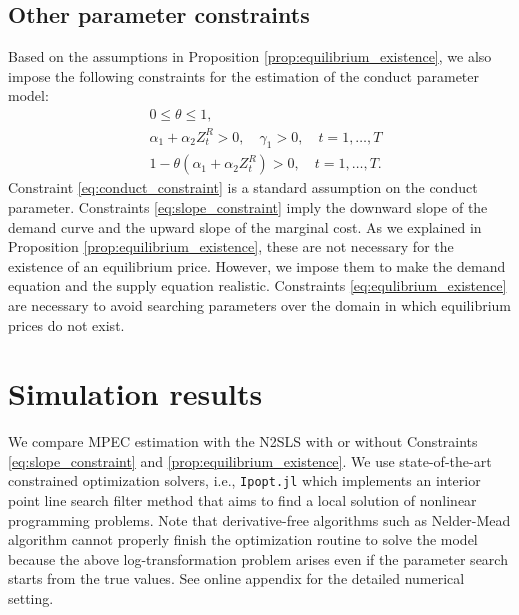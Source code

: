 \documentclass[11pt, a4paper]{article}
\begin{document}
\subsection{Other parameter constraints}
Based on the assumptions in Proposition \ref{prop:equilibrium_existence}, we also impose the following constraints for the estimation of the conduct parameter model:
\begin{align}
    &0\le\theta \le 1,\label{eq:conduct_constraint}\\
    &\alpha_1 + \alpha_2 Z_{t}^{R} >0, \quad \gamma_1>0 ,\quad t = 1,\ldots, T\label{eq:slope_constraint}\\
    &1- \theta(\alpha_1 + \alpha_2 Z_{t}^{R}) >0,\quad t = 1,\ldots, T.\label{eq:equlibrium_existence}
\end{align}
Constraint \eqref{eq:conduct_constraint} is a standard assumption on the conduct parameter.
Constraints \eqref{eq:slope_constraint} imply the downward slope of the demand curve and the upward slope of the marginal cost.
As we explained in Proposition \ref{prop:equilibrium_existence}, these are not necessary for the existence of an equilibrium price.
However, we impose them to make the demand equation and the supply equation realistic.
Constraints \eqref{eq:equlibrium_existence} are necessary to avoid searching parameters over the domain in which equilibrium prices do not exist. 

\section{Simulation results}\label{sec:results}

We compare MPEC estimation with the N2SLS with or without Constraints \eqref{eq:slope_constraint} and \ref{prop:equilibrium_existence}.
We use state-of-the-art constrained optimization solvers, i.e., \texttt{Ipopt.jl} which implements an interior point line search filter method that aims to find a local solution of nonlinear programming problems.
Note that derivative-free algorithms such as Nelder-Mead algorithm cannot properly finish the optimization routine to solve the model because the above log-transformation problem arises even if the parameter search starts from the true values. See online appendix for the detailed numerical setting. 

\end{document}
